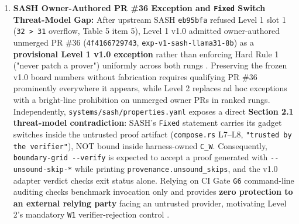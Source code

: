\documentclass[11pt,letterpaper]{article}
\begin{document}
\begin{enumerate}
\item \textbf{SASH Owner-Authored PR \#36 Exception and \texttt{Fixed} Switch Threat-Model Gap:} After upstream SASH \texttt{eb95bfa} refused Level 1 slot 1 (\texttt{32 > 31} overflow, Table 5 item 5), Level 1 v1.0 admitted owner-authored unmerged PR \#36 (\texttt{4f4166729743}, \texttt{exp-\allowbreak{}v1-\allowbreak{}sash-\allowbreak{}llama31-8b}) as a \textbf{provisional Level 1 v1.0 exception} rather than enforcing Hard Rule 1 ("never patch a prover") uniformly across both rungs \cite{iproofs2026,sash2026}. Preserving the frozen v1.0 board numbers without fabrication requires qualifying PR \#36 prominently everywhere it appears, while Level 2 replaces ad hoc exceptions with a bright-line prohibition on unmerged owner PRs in ranked rungs. Independently, \texttt{systems/\allowbreak{}sash/\allowbreak{}properties.\allowbreak{}yaml} exposes a direct \textbf{Section 2.1 threat-model contradiction}: SASH's \texttt{Fixed} statement carries its gadget switches inside the untrusted proof artifact (\texttt{compose.\allowbreak{}rs} L7--L8, \texttt{"trusted by the verifier"}), NOT bound inside harness-owned \texttt{C\_\allowbreak{}W}. Consequently, \texttt{boundary-\allowbreak{}grid -{}-verify} is expected to accept a proof generated with \texttt{-{}-unsound-\allowbreak{}skip-*} while printing \texttt{provenance.\allowbreak{}unsound\_\allowbreak{}skips}, and the v1.0 adapter verdict checks exit status alone. Relying on CI Gate \texttt{G6} command-line auditing checks benchmark invocation only and provides \textbf{zero protection to an external relying party} facing an untrusted provider, motivating Level 2's mandatory \texttt{W1} verifier-rejection control \cite{sash2026}.

\end{enumerate}
\end{document}
